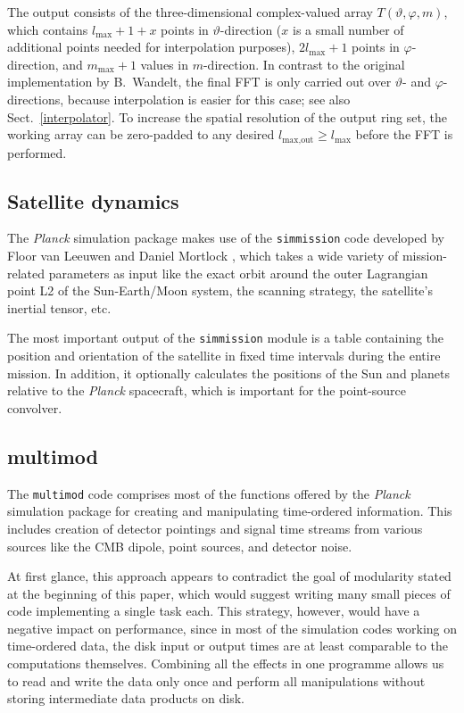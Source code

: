 \documentclass{aa}
\begin{document}
The output consists of the three-dimensional complex-valued array
$T(\vartheta,\varphi,m)$, which contains $l_{\text{max}}+1+x$ points
in $\vartheta$-direction ($x$ is a small number of additional points
needed for interpolation purposes), $2l_{\text{max}}+1$ points in
$\varphi$-direction, and $m_{\text{max}}+1$ values in
$m$-direction. In contrast to the original implementation by
B.~Wandelt, the final FFT is only carried out over $\vartheta$- and
$\varphi$-directions, because interpolation is easier for this case;
see also Sect.\ \ref{interpolator}.
To increase the spatial resolution of the output ring set, the working
array can be zero-padded to any desired $l_{\text{max,out}}\geq
l_{\text{max}}$ before the FFT is performed.

\subsection {Satellite dynamics}
\label{simmission}

The \emph{Planck} simulation package makes use of the {\tt simmission}
code developed by Floor van Leeuwen and Daniel Mortlock
\citep{vanLeeuwen-etal-2002,challinor-etal-2002}, which takes
a wide variety of mission-related parameters as input like the exact orbit
around the outer Lagrangian point L2 of the Sun-Earth/Moon system, the
scanning strategy, the satellite's inertial tensor, etc.

The most important output of the {\tt simmission} module is a table
containing the position and orientation of the satellite in fixed time
intervals during the entire mission. In addition, it optionally
calculates the positions of the Sun and planets relative to the
\emph{Planck} spacecraft, which is important for the point-source
convolver.

\subsection {multimod}
\label{multimod}

The {\tt multimod} code comprises most of the functions offered by
the \emph{Planck} simulation package for creating and manipulating
time-ordered information. This includes creation of detector pointings
and signal time streams from various sources like the CMB dipole,
point sources, and detector noise.

At first glance, this approach appears to contradict the goal of
modularity stated at the beginning of this paper, which would suggest
writing many small pieces of code implementing a single task each.
This strategy, however, would have a negative impact on performance,
since in most of the simulation codes working on time-ordered data,
the disk input or output times are at least comparable to the
computations themselves. Combining all the effects in one programme
allows us to read and write the data only once and perform all
manipulations without storing intermediate data products on disk.
\end{document}
